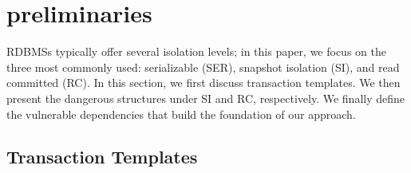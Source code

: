 \section{preliminaries}
RDBMSs typically offer several isolation levels; in this paper, we focus on the three most commonly used: serializable (SER), snapshot isolation (SI), and read committed (RC).
In this section, we first discuss transaction templates.
We then present the dangerous structures under SI and RC, respectively.
We finally define the vulnerable dependencies that build the foundation of our approach.

\subsection{Transaction Templates}




